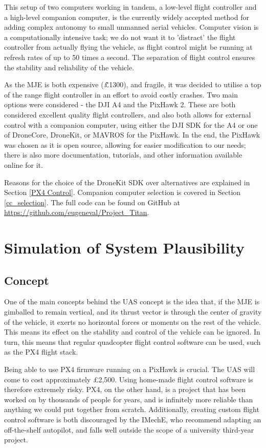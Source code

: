\documentclass[11pt,twoside]{article}
\begin{document}
This setup of two computers working in tandem, a low-level flight controller and a high-level companion computer, is the currently widely accepted method for adding complex autonomy to small unmanned aerial vehicles\cite{student_drone_platform}. Computer vision is a computationally intensive task; we do not want it to 'distract' the flight controller from actually flying the vehicle, as flight control might be running at refresh rates of up to 50 times a second. The separation of flight control ensures the stability and reliability of the vehicle.

As the MJE is both expensive (\~\pounds1300), and fragile, it was decided to utilise a top of the range flight controller in an effort to avoid costly crashes. Two main options were considered - the DJI A4 and the PixHawk 2. These are both considered excellent quality flight controllers, and also both allows for external control with a companion computer, using either the DJI SDK for the A4 or one of DroneCore, DroneKit, or MAVROS for the PixHawk. In the end, the PixHawk was chosen as it is open source, allowing for easier modification to our needs; there is also more documentation, tutorials, and other information available online for it.

Reasons for the choice of the DroneKit SDK over alternatives are explained in Section \ref{PX4 Control}. Companion computer selection is covered in Section \ref{cc_selection}. The full code can be found on GitHub at \url{https://github.com/eugeneval/Project_Titan}.


\section{Simulation of System Plausibility} \label{simulation}
\subsection{Concept}
One of the main concepts behind the UAS concept is the idea that, if the MJE is gimballed to remain vertical, and its thrust vector is through the center of gravity of the vehicle, it exerts no horizontal forces or moments on the rest of the vehicle. This means its effect on the stability and control of the vehicle can be ignored. In turn, this means that regular quadcopter flight control software can be used, such as the PX4 flight stack.

Being able to use PX4 firmware running on a PixHawk is crucial. The UAS will come to cost approximately \pounds2,500. Using home-made flight control software is therefore extremely risky. PX4, on the other hand, is a project that has been worked on by thousands of people for years, and is infinitely more reliable than anything we could put together from scratch. Additionally, creating custom flight control software is both discouraged by the IMechE, who recommend adapting an off-the-shelf autopilot\cite{IMechE_rules}, and falls well outside the scope of a university third-year project.
\end{document}
